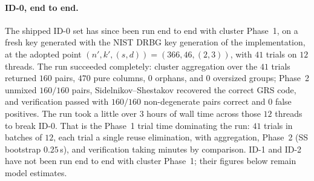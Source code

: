\paragraph{ID-0, end to end.} The shipped ID-0 set has since been
run end to end with cluster Phase~1, on a fresh key generated with
the NIST DRBG key generation of the implementation, at the adopted
point $(n', k', (s, d)) = (366, 46, (2, 3))$, with $41$ trials on
$12$ threads. The run succeeded completely: cluster aggregation
over the $41$ trials returned $160$ pairs, $470$ pure columns,
$0$ orphans, and $0$ oversized groups; Phase~2 unmixed $160/160$
pairs, Sidelnikov--Shestakov recovered the correct GRS code, and
verification passed with $160/160$ non-degenerate pairs correct
and $0$ false positives. The run took a little over $3$ hours of
wall time across those $12$ threads to break ID-0. That is the
Phase~1 trial time dominating the run: $41$ trials in batches of
$12$, each trial a single reuse elimination, with aggregation,
Phase~2 (SS bootstrap $0.25$\,s), and verification taking minutes
by comparison. ID-1 and ID-2 have not been run end to end with
cluster Phase~1; their figures below remain model estimates.
